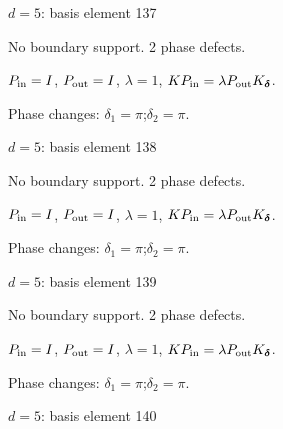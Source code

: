 \vfill
{\footnotesize\texttt{}}
\newpage
{}
{\Large $d=5$: basis element 137}\par
No boundary support. 2 phase defects.
\begin{center}
\end{center}
\vspace{-1mm}
$P_{\rm in}=I$, \quad $P_{\rm out}=I$, \quad $\lambda=1$, \qquad $K P_{\rm in}=\lambda P_{\rm out}K_{\boldsymbol\delta}$.
\par\smallskip\begin{minipage}{.98\linewidth}\small Phase changes: $\delta_{1}=\pi$;\quad $\delta_{2}=\pi$.\end{minipage}
\vfill
{\footnotesize\texttt{}}
\newpage
{}
{\Large $d=5$: basis element 138}\par
No boundary support. 2 phase defects.
\begin{center}
\end{center}
\vspace{-1mm}
$P_{\rm in}=I$, \quad $P_{\rm out}=I$, \quad $\lambda=1$, \qquad $K P_{\rm in}=\lambda P_{\rm out}K_{\boldsymbol\delta}$.
\par\smallskip\begin{minipage}{.98\linewidth}\small Phase changes: $\delta_{1}=\pi$;\quad $\delta_{2}=\pi$.\end{minipage}
\vfill
{\footnotesize\texttt{}}
\newpage
{}
{\Large $d=5$: basis element 139}\par
No boundary support. 2 phase defects.
\begin{center}
\end{center}
\vspace{-1mm}
$P_{\rm in}=I$, \quad $P_{\rm out}=I$, \quad $\lambda=1$, \qquad $K P_{\rm in}=\lambda P_{\rm out}K_{\boldsymbol\delta}$.
\par\smallskip\begin{minipage}{.98\linewidth}\small Phase changes: $\delta_{1}=\pi$;\quad $\delta_{2}=\pi$.\end{minipage}
\vfill
{\footnotesize\texttt{}}
\newpage
{}
{\Large $d=5$: basis element 140}\par
